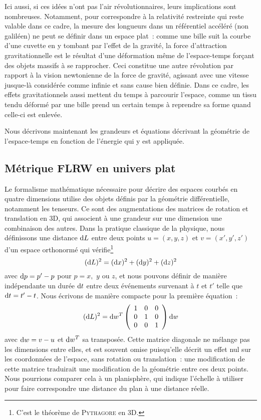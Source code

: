 \documentclass[../main/main.tex]{subfiles}
\begin{document}
Ici aussi, si ces idées n'ont pas l'air révolutionnaires, leurs implications
sont nombreuses. Notamment, pour correspondre à la relativité restreinte qui
reste valable dans ce cadre, la mesure des longueurs dans un référentiel
accéléré (non galiléen) ne peut se définir dans un espace plat~: comme une bille
suit la courbe d'une cuvette en y tombant par l'effet de la gravité, la force
d'attraction gravitationnelle est le résultat d'une déformation même de
l'espace-temps forçant des objets massifs à se rapprocher. Ceci constitue une
autre révolution par rapport à la vision newtonienne de la force de gravité,
agissant avec une vitesse jusque-là considérée comme infinie et sans cause bien
définie. Dans ce cadre, les effets gravitationnels aussi mettent du temps à
parcourir l'espace, comme un tissu tendu déformé par une bille prend un certain
temps à reprendre sa forme quand celle-ci est enlevée.

Nous décrivons maintenant les grandeurs et équations décrivant la géométrie de
l'espace-temps en fonction de l'énergie qui y est appliquée.

\subsection{Métrique FLRW en univers plat}\label{ssec:cons}

Le formalisme mathématique nécessaire pour décrire des espaces courbés en
quatre dimensions utilise des objets définis par la géométrie différentielle,
notamment les tenseurs. Ce sont des augmentations des matrices de rotation et
translation en 3D, qui associent à une grandeur sur une dimension une
combinaison des autres. Dans la pratique classique de la physique, nous
définissons une distance $\mathrm{d} L$ entre deux points $u=(x,y,z)$ et $v=(x',y',z')$
d'un espace orthonormé qui vérifie\footnote{C'est le théorème de
\textsc{Pythagore} en 3D.}
\begin{equation}
    (\mathrm{d} L)^2 = (\mathrm{d} x)^2 + (\mathrm{d} y)^2 + (\mathrm{d} z)^2
\end{equation}
avec $\mathrm{d} p = p'-p$ pour $p = x,$ $y$ ou $z$, et nous pouvons définir de manière
indépendante un durée $\mathrm{d} t$ entre deux événements survenant à $t$ et $t'$ telle
que $\mathrm{d} t = t'-t$. Nous écrivons de manière compacte pour la première équation~:
\begin{equation}
    (\mathrm{d} L)^2 = \mathrm{d} w^T\left(\begin{array}{c c c}
            1 & 0 & 0\\
            0 & 1 & 0\\
            0 & 0 & 1\\
    \end{array}\right)\mathrm{d} w
\end{equation}
avec $\mathrm{d} w = v-u$ et $\mathrm{d} w^T$ sa transposée. Cette matrice diagonale ne mélange
pas les dimensions entre elles, et est souvent omise puisqu'elle décrit un effet
nul sur les coordonnées de l'espace, sans rotation ou translation~: une
modification de cette matrice traduirait une modification de la géométrie entre
ces deux points. Nous pourrions comparer cela à un planisphère, qui indique
l'échelle à utiliser pour faire correspondre une distance du plan à une distance
réelle.
\end{document}
